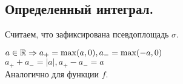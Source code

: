  \newpage

\subsection{Определенный интеграл.}

Считаем, что зафиксирована псевдоплощадь $\sigma$.


\begin{definition}
    $a \in \R \Rightarrow a_+ = \max(a, 0), a_- = \max(-a, 0)$ \\
    $a_+ + a_- = |a|, a_+ - a_- = a$ \\
    Аналогично для функции $f$. \\





    \begin{tikzpicture}[x=0.75pt,y=0.75pt,yscale=-1,xscale=1]
    

\end{tikzpicture}
\end{definition}
